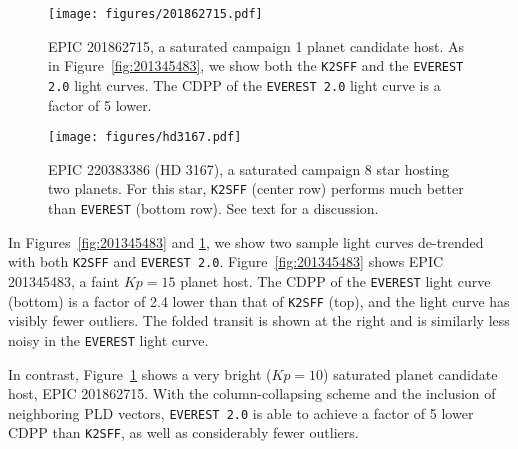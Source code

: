 \documentclass[]{emulateapj}
\newcommand{\Kp}{\ensuremath{Kp}}
\newcommand{\edited}[1]{{\color{red} #1}}
\begin{document}
\begin{figure}[hbt]
  \begin{center}
      \texttt{[image: figures/201862715.pdf]}
       \caption{EPIC 201862715, a saturated campaign 1 planet candidate host. As in
       Figure~\ref{fig:201345483}, we show both the \texttt{K2SFF} and the \texttt{EVEREST 2.0}
       light curves. The CDPP of the \texttt{EVEREST 2.0} light curve is a factor of 5 lower.}
     \label{fig:201862715}
  \end{center}
\end{figure}

\begin{figure}[hbt]
  \begin{center}
      \texttt{[image: figures/hd3167.pdf]}
       \caption{\edited{EPIC 220383386 (HD 3167), a saturated campaign 8 star hosting two
       planets. For this star,
       \texttt{K2SFF} (center row) performs much better than \texttt{EVEREST} (bottom row).
       See text for a discussion.}}
     \label{fig:hd3167}
  \end{center}
\end{figure}

In Figures~\ref{fig:201345483} and \ref{fig:201862715},  we show two sample light curves
de-trended with both \texttt{K2SFF} and \texttt{EVEREST 2.0}. Figure~\ref{fig:201345483}
shows EPIC 201345483, a faint $\Kp = 15$ planet host.
The CDPP of the \texttt{EVEREST} light curve (bottom) is a factor of 2.4 lower than that of
\texttt{K2SFF} (top), and the light curve has visibly fewer outliers. The folded transit
is shown at the right and is similarly less noisy in the \texttt{EVEREST} light curve.

In contrast, Figure~\ref{fig:201862715} shows a very bright ($\Kp = 10$) saturated
planet candidate host, EPIC 201862715. With the column-collapsing scheme and the
inclusion of neighboring PLD vectors, \texttt{EVEREST 2.0} is able to achieve a factor
of 5 lower CDPP than \texttt{K2SFF}, as well as considerably fewer outliers.
\end{document}
